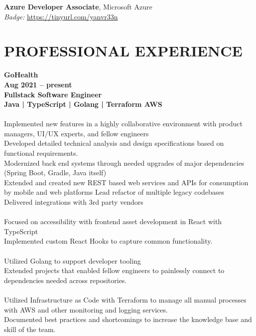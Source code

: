 \documentclass[margin,line]{resume}
\begin{document}
\begin{resume}
    \textbf{\listing Azure Developer Associate}, Microsoft Azure \vspace{1mm}\\
    \textsl{Badge: } \url{https://tinyurl.com/yanvr33n}

    \vspace{-1mm}

\sectionline


\sectionline

    \section{\mysidestyle \textbf{\large{P}\small{ROFESSIONAL} \large{E}\small{XPERIENCE}}}

    \textbf{\listing GoHealth} \vspace{-2mm}\\\vspace{0mm} \hfill \textbf{Aug 2021 -- present}\\
    \hfill \textbf{Fullstack Software Engineer}\\
    \mbox{} \hfill \vspace{-4mm} \textbf{Java | TypeScript | Golang | Terraform AWS}\\\\
    Implemented new features in a highly collaborative environment with product managers, UI/UX experts, and fellow engineers\\
    Developed detailed technical analysis and design specifications based on functional requirements.\\
    Modernized back end systems through needed upgrades of major dependencies (Spring Boot, Gradle, Java itself)\\
    Extended and created new REST based web services and APIs for consumption by mobile and web platforms
    Lead refactor of multiple legacy codebases\\
    Delivered integrations with 3rd party vendors\\ \\
    Focused on accessibility with frontend asset development in React with TypeScript\\
    Implemented custom React Hooks to capture common functionality.\\\\
    Utilized Golang to support developer tooling\\
    Extended projects that enabled fellow engineers to painlessly connect to dependencies needed across repositories.\\ 
    \\
    Utilized Infrastructure as Code with Terraform to manage all manual processes with AWS and other monitoring and logging services.\\
    Documented best practices and shortcomings to increase the knowledge base and skill of the team.\\ 


\end{resume}
\end{document}
